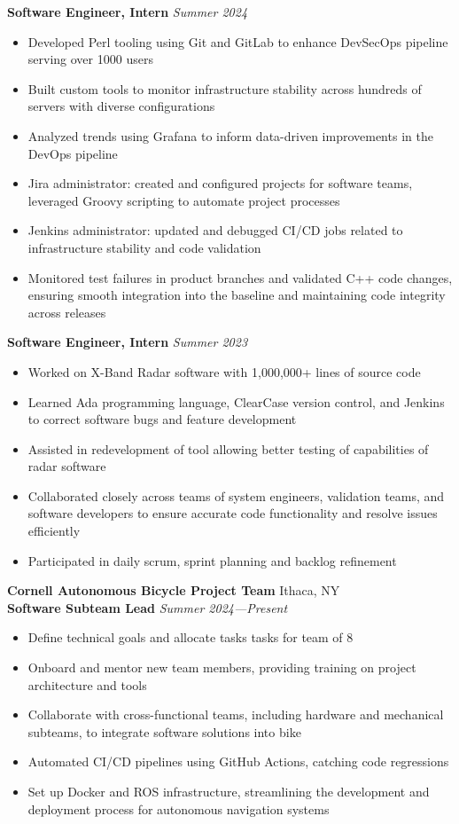 \documentclass[letterpaper,10pt]{article}
\newcommand{\company}[2]{
    \vspace{6pt}
    {\large \textbf{#1}}
    \hfill
    {\normalsize {#2}}
    \\
}
\newcommand{\position}[2]{
    \vspace{4pt}
    {\normalsize \textbf {#1}}
    \hfill
    {\normalsize \textit{#2}}
    \\
}
\newcommand{\itemsBegin}{
    \begin{itemize}[leftmargin=0.2in, labelsep=0.05in, itemsep=0pt, parsep=1pt, topsep=0pt, partopsep=0pt]
}
\newcommand{\itemsEnd}{\end{itemize}}
\begin{document}
    \position{Software Engineer, Intern}{Summer 2024}
    \itemsBegin{}
        \item Developed Perl tooling using Git and GitLab to enhance DevSecOps pipeline serving over 1000 users
        \item Built custom tools to monitor infrastructure stability across hundreds of servers with diverse configurations
        \item Analyzed trends using Grafana to inform data-driven improvements in the DevOps pipeline
        \item Jira administrator: created and configured projects for software teams, leveraged Groovy scripting to automate project processes
        \item Jenkins administrator: updated and debugged CI/CD jobs related to infrastructure stability and code validation
        \item Monitored test failures in product branches and validated C++ code changes, ensuring smooth integration into the baseline and maintaining code integrity across releases
    \itemsEnd{}

    \position{Software Engineer, Intern}{Summer 2023}
    \itemsBegin{}
        \item Worked on X-Band Radar software with 1,000,000+ lines of source code
        \item Learned Ada programming language, ClearCase version control, and Jenkins to correct software bugs and feature development
        \item Assisted in redevelopment of tool allowing better testing of capabilities of radar software
        \item Collaborated closely across teams of system engineers, validation teams, and software developers to ensure accurate code functionality and resolve issues efficiently
        \item Participated in daily scrum, sprint planning and backlog refinement
    \itemsEnd{}

    \company{Cornell Autonomous Bicycle Project Team}{Ithaca, NY}

    \position{Software Subteam Lead}{Summer 2024---Present}
    \itemsBegin{}
        \item Define technical goals and allocate tasks tasks for team of 8
        \item Onboard and mentor new team members, providing training on project architecture and tools
        \item Collaborate with cross-functional teams, including hardware and mechanical subteams, to integrate software solutions into bike
        \item Automated CI/CD pipelines using GitHub Actions, catching code regressions
        \item Set up Docker and ROS infrastructure, streamlining the development and deployment process for autonomous navigation systems
    \itemsEnd{}
\end{document}
